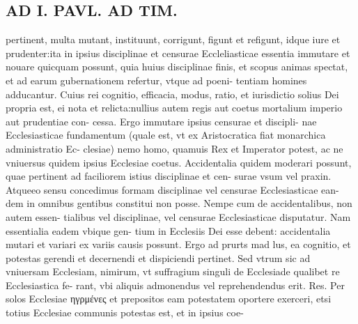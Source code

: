 \documentclass{article}
\begin{document}
\begin{pages}
\section*{AD I. PAVL. AD TIM. }
\marginpar{[ p.244 ]}\pstart pertinent, multa mutant, instituunt, corrigunt, figunt et refigunt, idque iure et prudenter:ita in ipsius disciplinae et censurae Eccleliasticae essentia immutare et nouare quicquam possunt, quia huius disciplinae finis, et scopus animas spectat, et ad earum gubernationem refertur, vtque ad poeni- tentiam homines adducantur. Cuius rei cognitio, efficacia, modus, ratio, et iurisdictio solius Dei propria est, ei nota et relicta:nullius autem regis aut coetus mortalium imperio aut prudentiae con- cessa. Ergo immutare ipsius censurae et discipli- nae Ecclesiasticae fundamentum (quale est, vt ex Aristocratica fiat monarchica administratio Ec- clesiae) nemo homo, quamuis Rex et Imperator potest, ac ne vniuersus quidem ipsius Ecclesiae coetus. Accidentalia quidem moderari possunt, quae pertinent ad faciliorem istius disciplinae et cen- surae vsum vel praxin. Atqueeo sensu concedimus formam disciplinae vel censurae Ecclesiasticae ean- dem in omnibus gentibus constitui non posse. Nempe cum de accidentalibus, non autem essen- tialibus vel disciplinae, vel censurae Ecclesiasticae disputatur. Nam essentialia eadem vbique gen- tium in Ecclesiis Dei esse debent: accidentalia mutari et variari ex variis causis possunt. Ergo ad prurts mad lus, ea cognitio, et potestas gerendi et decernendi et dispiciendi pertinet. Sed vtrum sic ad vniuersam Ecclesiam, nimirum, vt suffragium singuli de Ecclesiade qualibet re Ecclesiastica fe- rant, vbi aliquis admonendus vel reprehendendus erit. Res. Per solos Ecclesiae ηγρμένες et prepositos eam potestatem oportere exerceri, etsi totius Ecclesiae communis potestas est, et in ipsius coe-  \pend

\end{pages}
\end{document}
